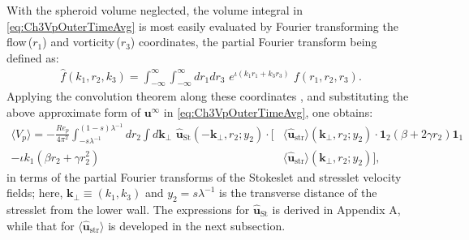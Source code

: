 \documentclass{jfm}
\begin{document}
With the spheroid volume neglected, the volume integral in \eqref{eq:Ch3VpOuterTimeAvg} is most easily evaluated by Fourier transforming the flow\,($r_1$) and vorticity\,($r_3$) coordinates, the partial Fourier transform being defined as:
\begin{align}
\hat{f}(k_1,r_2,k_3) =\int_{-\infty}^\infty \int_{-\infty}^\infty dr_1 dr_3\,\,e^{\iota(k_1 r_1+k_3 r_3)}\,\,f(r_1,r_2,r_3).
\label{eq:Ch3FTdefn}
\end{align}
Applying the convolution theorem along these coordinates \citep{arfkenweber}, and substituting the above approximate form of $\bm{u}^\infty$ in \eqref{eq:Ch3VpOuterTimeAvg}, one obtains:
\begin{align}
\langle V_p\rangle =-\frac{Re_p}{4\pi^2}\int_{-s\lambda^{-1}}^{(1-s)\lambda^{-1}} dr_2\int d\bm{k}_\perp\,\,\hat{\bm{u}}_\text{St}(-\bm{k}_\perp,r_2;y_2)\cdot
\big[&\langle\hat{\bm{u}}_\text{str}\rangle(\bm{k}_\perp,r_2;y_2)\cdot\bm{1}_2(\beta+2\gamma r_2)\bm{1}_1\nonumber\\
-\iota k_1(\beta r_2 +\gamma r_2^2)& \langle\hat{\bm{u}}_\text{str}\rangle(\bm{k}_\perp,r_2;y_2)\big], \label{eq:Ch3VpOuterTimeAvgFT}
\end{align}
in terms of the partial Fourier transforms of the Stokeslet and stresslet velocity fields; here, $\bm{k}_\perp \equiv (k_1,k_3)$ and $y_2 =s\lambda^{-1}$ is the transverse distance of the stresslet from the lower wall. The expressions for $\hat{\bm{u}}_\text{St}$ is derived in Appendix A, while that for $\langle\hat{\bm{u}}_\text{str}\rangle$ is developed in the next subsection.
\end{document}
